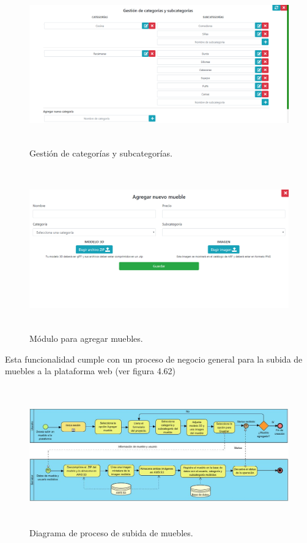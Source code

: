 \begin{figure}[hbt!]
	\centering
	\includegraphics[width=15cm,height=7cm]{imagenes/desarrollo/app/WEB_CATEGORIES.png}
	\caption{Gestión de categorías y subcategorías.}
	\label{fig:webcat}
\end{figure}
\begin{figure}[hbt!]
	\centering
	\includegraphics[width=15cm,height=7cm]{imagenes/desarrollo/app/WEB_ADD.png}
	\caption{Módulo para agregar muebles.}
	\label{fig:webadd}
\end{figure}

Esta funcionalidad cumple con un proceso de negocio general para la subida de muebles a la plataforma web (ver figura 4.62)

\begin{figure}[h!]
	\centering
	\includegraphics[width=15cm,height=6cm]{imagenes/desarrollo/diagramas/BPMN_UPLOAD_FURNITURE.jpg}
	\caption{Diagrama de proceso de subida de muebles.}
	\label{fig:recover}
\end{figure}
\clearpage